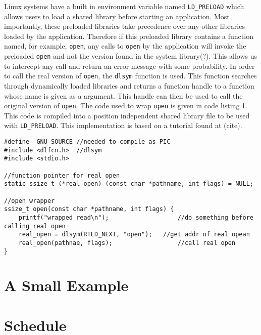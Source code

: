 \documentclass[10pt]{article}
\begin{document}
Linux systems have a built in environment variable named \texttt{LD\_PRELOAD} which allows users to load a shared library before starting an application. Most importantly, these preloaded libraries take precedence over any other libraries loaded by the application. Therefore if this preloaded library contains a function named, for example, \texttt{open}, any calls to \texttt{open} by the application will invoke the preloaded \texttt{open} and not the version found in the system library(?). This allows us to intercept any call and return an error message with some probability. In order to call the real version of \texttt{open}, the \texttt{dlsym} function is used. This function searches through dynamically loaded libraries and returns a function handle to a function whose name is given as a argument. This handle can then be used to call the original version of \texttt{open}. The code used to wrap \texttt{open} is given in code listing 1. This code is compiled into a position independent shared library file to be used with \texttt{LD\_PRELOAD}. This implementation is based on a tutorial found at (cite).
\begin{lstlisting}[caption=\texttt{open} wrapper]
#define _GNU_SOURCE	//needed to compile as PIC
#include <dlfcn.h>	//dlsym
#include <stdio.h>

//function pointer for real open
static ssize_t (*real_open) (const char *pathname, int flags) = NULL;

//open wrapper
ssize_t open(const char *pathname, int flags) {
	printf("wrapped read\n");					//do something before calling real open
	real_open = dlsym(RTLD_NEXT, "open"); 	//get addr of real opean
	real_open(pathnae, flags);					//call real open
}
\end{lstlisting}


\section{A Small Example}

\section{Schedule}
\end{document}

